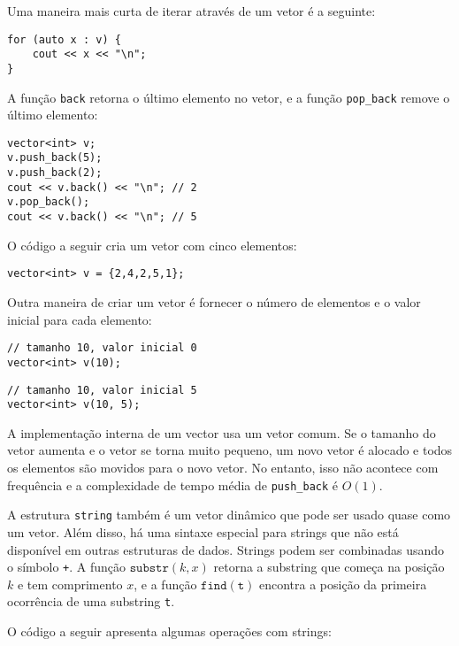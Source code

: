 \begin{samepage}
Uma maneira mais curta de iterar através de um vetor é a seguinte:

\begin{lstlisting}
for (auto x : v) {
    cout << x << "\n";
}
\end{lstlisting}
\end{samepage}

A função \texttt{back} retorna o último elemento
no vetor, e
a função \texttt{pop\_back} remove o último elemento:

\begin{lstlisting}
vector<int> v;
v.push_back(5);
v.push_back(2);
cout << v.back() << "\n"; // 2
v.pop_back();
cout << v.back() << "\n"; // 5
\end{lstlisting}

O código a seguir cria um vetor com cinco elementos:

\begin{lstlisting}
vector<int> v = {2,4,2,5,1};
\end{lstlisting}

Outra maneira de criar um vetor é fornecer o número
de elementos e o valor inicial para cada elemento:

\begin{lstlisting}
// tamanho 10, valor inicial 0
vector<int> v(10);
\end{lstlisting}
\begin{lstlisting}
// tamanho 10, valor inicial 5
vector<int> v(10, 5);
\end{lstlisting}

A implementação interna de um vector
usa um vetor comum.
Se o tamanho do vetor aumenta e
o vetor se torna muito pequeno,
um novo vetor é alocado e todos os
elementos são movidos para o novo vetor.
No entanto, isso não acontece com frequência e a
complexidade de tempo média de
\texttt{push\_back} é $O(1)$.


A estrutura \texttt{string}
também é um vetor dinâmico que pode ser usado quase como um vetor.
Além disso, há uma sintaxe especial para strings
que não está disponível em outras estruturas de dados.
Strings podem ser combinadas usando o símbolo \texttt{+}.
A função $\texttt{substr}(k,x)$ retorna a substring
que começa na posição $k$ e tem comprimento $x$,
e a função $\texttt{find}(\texttt{t})$ encontra a posição
da primeira ocorrência de uma substring \texttt{t}.

O código a seguir apresenta algumas operações com strings:

